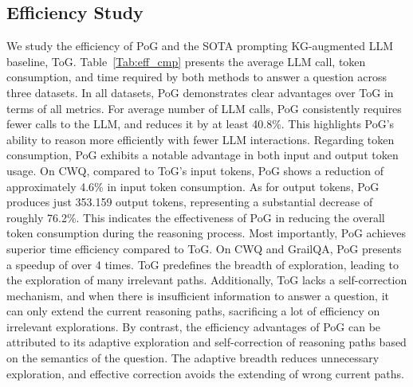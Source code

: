 \documentclass{article}
\begin{document}
\vspace{-2mm}
\subsection{Efficiency Study}
\vspace{-2mm}
We study the efficiency of PoG and the SOTA prompting KG-augmented LLM baseline, ToG.
Table~\ref{Tab:eff_cmp} presents the average LLM call, token consumption, and time required by both methods to answer a question across three datasets.
In all datasets, PoG demonstrates clear advantages over ToG in terms of all metrics.
For average number of LLM calls, PoG consistently requires fewer calls to the LLM, and reduces it by at least 40.8\%.
This highlights PoG's ability to reason more efficiently with fewer LLM interactions.
Regarding token consumption, PoG exhibits a notable advantage in both input and output token usage. On CWQ, compared to ToG's input tokens, PoG shows a reduction of approximately 4.6\% in input token consumption. As for output tokens, PoG produces just 353.159 output tokens, representing a substantial decrease of roughly 76.2\%. This indicates the effectiveness of PoG in reducing the overall token consumption during the reasoning process.
Most importantly, PoG achieves superior time efficiency compared to ToG. On CWQ and GrailQA, PoG presents a speedup of over 4 times.
ToG predefines the breadth of exploration, leading to the exploration of many irrelevant paths.
Additionally, ToG lacks a self-correction mechanism, and when there is insufficient information to answer a question, it can only extend the current reasoning paths, sacrificing a lot of efficiency on irrelevant explorations.
By contrast, the efficiency advantages of PoG can be attributed to its adaptive exploration and self-correction of reasoning paths based on the semantics of the question. The adaptive breadth reduces unnecessary exploration, and effective correction avoids the extending of wrong current paths.
\end{document}
